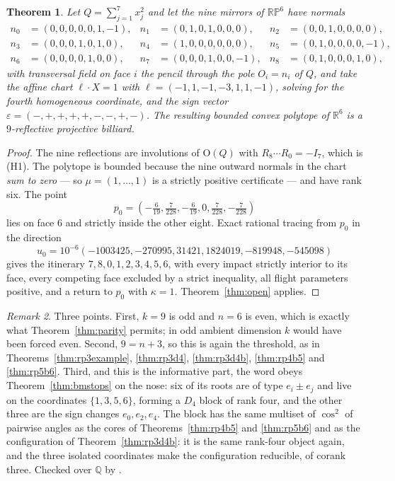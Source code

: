 \documentclass[11pt,a4paper]{article}
\theoremstyle{plain}
\newtheorem{theorem}{Theorem}[section]
\theoremstyle{definition}
\theoremstyle{remark}
\newtheorem{remark}[theorem]{Remark}
\begin{document}
\begin{theorem}\label{thm:rp6b7}
Let $Q=\sum_{j=1}^{7}x_j^2$ and let the nine mirrors of $\mathbb{RP}^6$ have normals
\[
\begin{aligned}
  n_0&=(0,0,0,0,0,1,-1), & n_1&=(0,1,0,1,0,0,0), & n_2&=(0,0,1,0,0,0,0),\\
  n_3&=(0,0,0,1,0,1,0),  & n_4&=(1,0,0,0,0,0,0), & n_5&=(0,1,0,0,0,0,-1),\\
  n_6&=(0,0,0,0,1,0,0),  & n_7&=(0,0,0,1,0,0,-1),& n_8&=(0,1,0,0,0,1,0),
\end{aligned}
\]
with transversal field on face $i$ the pencil through the pole $O_i=n_i$ of $Q$, and
take the affine chart $\ell\cdot X=1$ with $\ell=(-1,1,-1,-3,1,1,-1)$, solving for the
fourth homogeneous coordinate, and the sign vector
$\varepsilon=(-,+,+,+,+,-,-,+,-)$. The resulting bounded convex polytope of
$\mathbb{R}^6$ is a $9$-reflective projective billiard.
\end{theorem}

\begin{proof}
The nine reflections are involutions of $\mathrm{O}(Q)$ with $R_8\cdots R_0=-I_7$,
which is (H1). The polytope is bounded because the nine outward normals in the chart
\emph{sum to zero} --- so $\mu=(1,\dots,1)$ is a strictly positive certificate --- and
have rank six. The point
\[
p_0=(-\tfrac6{19},\tfrac7{228},-\tfrac6{19},0,
\tfrac7{228},-\tfrac7{228})
\]
lies on face $6$ and strictly inside the other eight. Exact rational tracing from
$p_0$ in the direction
\[
u_0=10^{-6}(-1003425,-270995,31421,1824019,-819948,-545098)
\]
gives the itinerary
$7,8,0,1,2,3,4,5,6$, with every impact strictly interior to its face, every competing
face excluded by a strict inequality, all flight parameters positive, and a return to
$p_0$ with $\kappa=1$. Theorem~\ref{thm:open} applies.
\end{proof}

\begin{remark}
Three points. First, $k=9$ is odd and $n=6$ is even, which is exactly what
Theorem~\ref{thm:parity} permits; in odd ambient dimension $k$ would have been forced
even. Second, $9=n+3$, so this is again the threshold, as in
Theorems~\ref{thm:rp3example}, \ref{thm:rp3d4}, \ref{thm:rp3d4b}, \ref{thm:rp4b5} and
\ref{thm:rp5b6}. Third, and this is the informative part, the word obeys
Theorem~\ref{thm:bmstops} on the nose: six of its roots are of type $e_i\pm e_j$ and
live on the coordinates $\{1,3,5,6\}$, forming a $D_4$ block of rank four, and the
other three are the sign changes $e_0,e_2,e_4$. The block has the same multiset of
$\cos^2$ of pairwise angles as the cores of Theorems~\ref{thm:rp4b5} and
\ref{thm:rp5b6} and as the configuration of Theorem~\ref{thm:rp3d4b}: it is the same
rank-four object again, and the three isolated coordinates make the configuration
reducible, of corank three. Checked over $\mathbb{Q}$ by
.
\end{remark}
\end{document}
